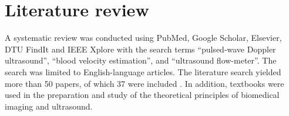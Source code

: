 \section{Literature review}

A systematic review was conducted using PubMed, Google Scholar, Elsevier, DTU FindIt and IEEE Xplore with the search terms \enquote{pulsed-wave Doppler ultrasound}, \enquote{blood velocity estimation}, and \enquote{ultrasound flow-meter}. The search was limited to English-language articles. The literature search yielded more than 50 papers, of which 37 were included \cite{Satomura_CW,Baker1970,Shung1976,Schlindwein1988,Hall_Wall_Filter,Jensen_Analysis_PW_1996,Wells1998,PWDesignParameters,Jansson_Estimation_Perfusion,Hoskins_Review_Blood_Velocity,Fish_Ultrasonic,Jensen_Algorithms,cmut_array_shape,Williams2006,Tsang2009,Matsuoka_Doppler_Rabbit,Hoskins2010,PICpulser,Advances_BloodFlow_Velocity,Overview_Emerging_Imaging,Huang_Smartphone_2012,DesignDocument,Winckler2012,Sagdiev2014,Jacinta_string_phantom,500Vpulser,Wang2016,Govindan2016,Wang2019,JanaSmartphone2020,Ding_PW_Pmut,DingPMUTs,Winder2021,Omura2022,2023_review,Ricci2018,Bessi1995}. In addition, textbooks \cite{JensenUltrasoundBook,ShungUltrasound_Book,Szabo_UltrasoundBook_2} were used in the preparation and study of the theoretical principles of biomedical imaging and ultrasound.

